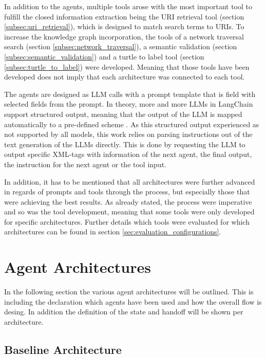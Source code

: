 \documentclass[a4paper,oneside,bibliography=totoc]{scrbook}
\begin{document}
In addition to the agents, multiple tools arose with the most important tool to fulfill the closed information extraction being the URI retrieval tool (section \ref{subsec:uri_retrieval}), which is designed to match search terms to URIs. To increase the knowledge graph incorporation, the tools of a network traversal search (section \ref{subsec:network_traversal}), a semantic validation (section \ref{subsec:semantic_validation}) and a turtle to label tool (section \ref{subsec:turtle_to_label}) were developed. Meaning that those tools have been developed does not imply that each architecture was connected to each tool.

The agents are designed as \ac{LLM} calls with a prompt template that is field with selected fields from the prompt. In theory, more and more \acp{LLM} in LangChain support structured output, meaning that the output of the \ac{LLM} is mapped automatically to a pre-defined scheme \cite{LangChain2025e}. As this structured output experienced as not supported by all models, this work relies on parsing instructions out of the text generation of the \acp{LLM} directly. This is done by requesting the \ac{LLM} to output specific XML-tags with information of the next agent, the final output, the instruction for the next agent or the tool input.

In addition, it has to be mentioned that all architectures were further advanced in regards of prompts and tools through the process, but especially those that were achieving the best results. As already stated, the process were imperative and so was the tool development, meaning that some tools were only developed for specific architectures. Further details which tools were evaluated for which architectures can be found in section \ref{sec:evaluation_configurations}.

\section{Agent Architectures}
\label{sec:agent_architectures}

In the following section the various agent architectures will be outlined. This is including the declaration which agents have been used and how the overall flow is desing. In addition the definition of the state and handoff will be shown per architecture.

\subsection{Baseline Architecture}
\label{subsec:baseline}
\end{document}
